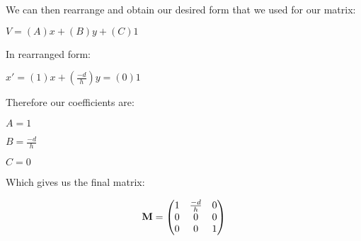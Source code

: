 \documentclass[12pt]{article}
\begin{document}
We can then rearrange and obtain our desired form that we used for our matrix:

$V = (A)x + (B)y + (C)1$

In rearranged form:

$x' = (1)x + ({\frac{-d}{h}})y = (0)1$

Therefore our coefficients are:

$A = 1$

$B = {\frac{-d}{h}}$

$C = 0$

Which gives us the final matrix:

\begin{align}
\textbf{M} &=
\begin{pmatrix}
1 & {\frac{-d}{h}} & 0 \\
0 & 0 & 0 \hfill \\
0 & 0 & 1 \hfill 
\end{pmatrix} \nonumber \\
\end{align}
\end{document}
